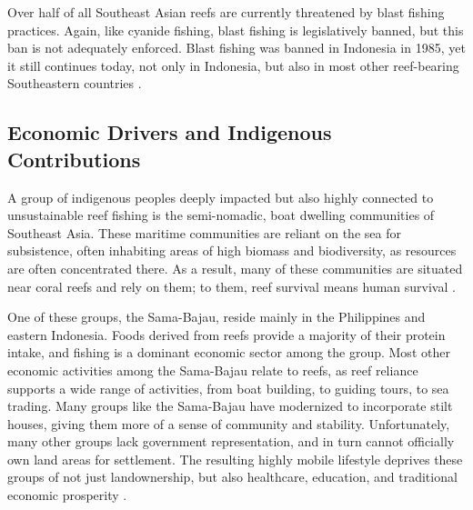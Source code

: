 \documentclass{book}\usepackage{knitr}
\begin{document}
Over half of all Southeast Asian reefs are currently threatened by blast fishing practices. Again, like cyanide fishing, blast fishing is legislatively banned, but this ban is not adequately enforced. Blast fishing was banned in Indonesia in 1985, yet it still continues today, not only in Indonesia, but also in most other reef-bearing Southeastern countries \citep{https://doi.org/10.1890/1051-0761(2006)016[1631:RFBFOC]2.0.CO;2}. 


\subsection{Economic Drivers and Indigenous Contributions}

A group of indigenous peoples deeply impacted but also highly connected to unsustainable reef fishing is the semi-nomadic, boat dwelling communities of Southeast Asia. These maritime communities are reliant on the sea for subsistence, often inhabiting areas of high biomass and biodiversity, as resources are often concentrated there. As a result, many of these communities are situated near coral reefs and rely on them; to them, reef survival means human survival \citep{boatpeople}. 

One of these groups, the Sama-Bajau, reside mainly in the Philippines and eastern Indonesia. Foods derived from reefs provide a majority of their protein intake, and fishing is a dominant economic sector among the group. Most other economic activities among the Sama-Bajau relate to reefs, as reef reliance supports a wide range of activities, from boat building, to guiding tours, to sea trading. Many groups like the Sama-Bajau have modernized to incorporate stilt houses, giving them more of a sense of community and stability. Unfortunately, many other groups lack government representation, and in turn cannot officially own land areas for settlement. The resulting highly mobile lifestyle deprives these groups of not just landownership, but also healthcare, education, and traditional economic prosperity \citep{boatpeople}.
\end{document}
